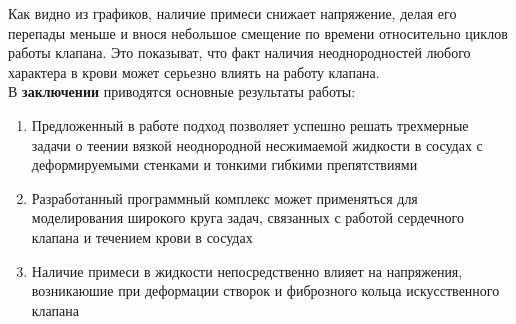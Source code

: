 Как видно из графиков, наличие примеси снижает напряжение, делая его перепады меньше и внося небольшое
смещение по времени относительно циклов работы клапана. Это показыват, что факт наличия неоднородностей
любого характера в крови может серьезно влиять на работу клапана.\\

В \textbf{заключении} приводятся основные результаты работы:
\begin{enumerate}
 \item Предложенный в работе подход позволяет успешно решать трехмерные задачи
     о теении вязкой неоднородной несжимаемой жидкости в сосудах с
     деформируемыми стенками и тонкими гибкими препятствиями
 \item Разработанный программный комплекс может применяться для моделирования
     широкого круга задач, связанных с работой сердечного клапана и течением
     крови в сосудах
 \item Наличие примеси в жидкости непосредственно влияет на напряжения, возникаюшие
     при деформации створок и фиброзного кольца искусственного клапана
\end{enumerate}

\renewcommand{\refname}{\Large Публикации автора по теме диссертации}
\nocite{*}


